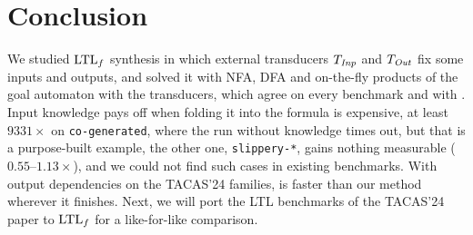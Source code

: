 \section{Conclusion}\label{sec:conclusion}

We studied $\text{LTL}_f$ synthesis in which external transducers $T_{\mathit{Inp}}$ and $T_{\mathit{Out}}$ fix some inputs and outputs, and solved it with NFA, DFA and on-the-fly products of the goal automaton with the transducers, which agree on every benchmark and with .
Input knowledge pays off when folding it into the formula is expensive, at least $9331\times$ on \texttt{co-generated}, where the run without knowledge times out, but that is a purpose-built example, the other one, \texttt{slippery-*}, gains nothing measurable ($0.55$--$1.13\times$), and we could not find such cases in existing benchmarks.
With output dependencies on the TACAS'24 families,  is faster than our method wherever it finishes.
Next, we will port the LTL benchmarks of the TACAS'24 paper to $\text{LTL}_f$ for a like-for-like comparison.

